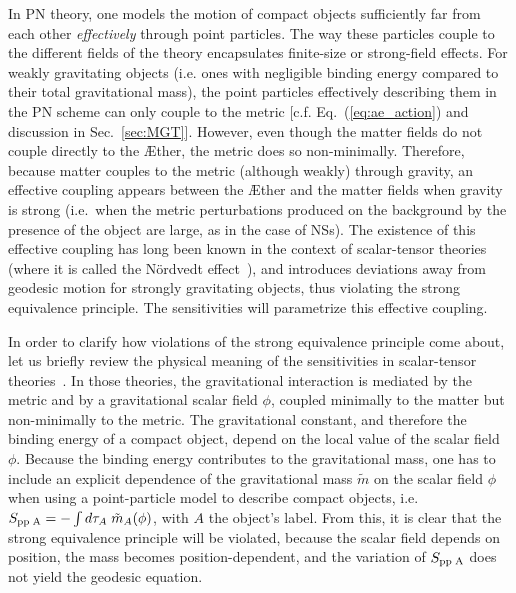 \documentclass[prd,aps,twocolumn,nofootinbib,showpacs,superscriptaddress]{revtex4-1}
\begin{document}
In PN theory, one models the motion of compact objects sufficiently far from each other
 {\textit{effectively}} through point particles.  
The way these particles couple to  the different fields of the theory encapsulates finite-size or strong-field effects.
For weakly gravitating objects (i.e. ones with negligible binding energy compared to
their total gravitational mass),
the point particles effectively describing them in the PN scheme can only couple to the metric [c.f. 
Eq.~(\ref{eq:ae_action}) and discussion in  Sec.~\ref{sec:MGT}].
However, even though the matter fields do not couple directly to the \AE ther, the metric
does so non-minimally. Therefore, because matter couples to the metric (although weakly) through gravity, 
an effective coupling appears between the \AE ther and the matter fields when gravity is strong (i.e.~when the metric perturbations produced
on the background by the presence of the object are large, as in the case of NSs). The existence of this effective coupling has long been known 
in the context of scalar-tensor theories (where it is called the N\"ordvedt
effect~\cite{nordvedt,nordvedt_dickes_interpretation}), and introduces deviations
away from geodesic motion for strongly gravitating objects, thus violating 
the strong equivalence principle. The sensitivities will parametrize this effective coupling.

In order to clarify how violations of the strong equivalence principle come about, 
let us briefly review the physical meaning of the sensitivities in scalar-tensor
theories~\cite{eardley}.
In those theories, the gravitational interaction is mediated by the metric and by
a gravitational scalar field $\phi$, coupled minimally to the matter but non-minimally to the metric.
The gravitational constant, and therefore the binding energy of a compact object, depend on the local value 
of the scalar field $\phi$. Because the binding energy contributes to
the gravitational mass,  one has to include an explicit dependence of the gravitational mass $\tilde{m}$ 
on the scalar field $\phi$ when using a point-particle model to describe compact 
objects, i.e.~$S_{\rm pp \; A} = - \int d\tau_A \; \tilde{m}_{A}(\phi)$, with $A$ the object's label.
From this, it is clear that the strong equivalence principle will be violated, because 
the scalar field depends on position, the mass becomes position-dependent, and the 
variation of $S_{\rm pp \; A}$ does not yield the geodesic equation.
\end{document}
